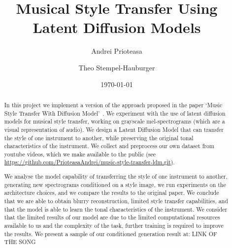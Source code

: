 \documentclass[12pt]{article}
\title{Musical Style Transfer Using Latent Diffusion Models}
\author{Andrei Prioteasa \and Theo Stempel-Hauburger}
\date{\today}
\begin{document}
\maketitle

\tableofcontents
\begin{abstract}
    \noindent In this project we implement a version of the approach proposed in the paper `Music Style Transfer With Diffusion Model'~\cite{huang2024music}. We experiment with the use of latent diffusion models for musical style transfer, working on grayscale mel-spectrograms (which are a visual representation of audio). We design a Latent Diffusion Model that can transfer the style of one instrument to another, while preserving the original tonal characteristics of the instrument. We collect and preprocess our own dataset from youtube videos, which we make available to the public (see \url{https://github.com/PrioteasaAndrei/music-style-transfer-ldm.git}). 
    
    We analyse the model capability of transferring the style of one instrument to another, generating new spectrograms conditioned on a style image, we run experiments on the architecture choices, and we compare the results to the original paper. We conclude that we are able to obtain blurry reconstruction, limited style transfer capabilities, and that the model is able to learn the tonal characteristics of the instrument. We consider that the limited results of our model are due to the limited computational resources available to us and the complexity of the task, further training is required to improve the results. We present a sample of our conditioned generation result at: LINK OF THE SONG
   
\end{abstract}











\end{document}
